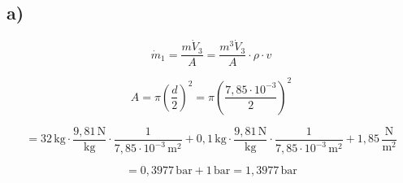 

\subsection*{a)}

\[
\dot{m}_{1} = \frac{m \dot{V}_{3}}{A} = \frac{m^3 \dot{V}_{3}}{A} \cdot \rho \cdot v
\]

\[
A = \pi \left( \frac{d}{2} \right)^2 = \pi \left( \frac{7,85 \cdot 10^{-3}}{2} \right)^2
\]

\[
= 32 \, \text{kg} \cdot \frac{9,81 \, \text{N}}{\text{kg}} \cdot \frac{1}{7,85 \cdot 10^{-3} \, \text{m}^2} + 0,1 \, \text{kg} \cdot \frac{9,81 \, \text{N}}{\text{kg}} \cdot \frac{1}{7,85 \cdot 10^{-3} \, \text{m}^2} + 1,85 \, \frac{\text{N}}{\text{m}^2}
\]

\[
= 0,3977 \, \text{bar} + 1 \, \text{bar} = 1,3977 \, \text{bar}
\]